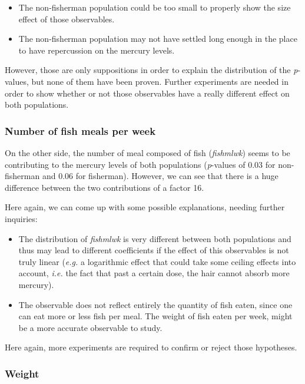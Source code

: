 \documentclass[12pt,]{article}
\providecommand{\tightlist}{%
  \setlength{\itemsep}{0pt}\setlength{\parskip}{0pt}}
\begin{document}
\begin{itemize}
\tightlist
\item
  The non-fisherman population could be too small to properly show the
  size effect of those observables.
\item
  The non-fisherman population may not have settled long enough in the
  place to have repercussion on the mercury levels.
\end{itemize}

However, those are only suppositions in order to explain the
distribution of the \emph{p}-values, but none of them have been proven.
Further experiments are needed in order to show whether or not those
observables have a really different effect on both populations.

\subsubsection{Number of fish meals per
week}\label{number-of-fish-meals-per-week}

On the other side, the number of meal composed of fish (\emph{fishmlwk})
seems to be contributing to the mercury levels of both populations
(\emph{p}-values of 0.03 for non-fisherman and 0.06 for fisherman).
However, we can see that there is a huge difference between the two
contributions of a factor 16.

Here again, we can come up with some possible explanations, needing
further inquiries:

\begin{itemize}
\item
  The distribution of \emph{fishmlwk} is very different between both
  populations and thus may lead to different coefficients if the effect
  of this observables is not truly linear (\emph{e.g.} a logarithmic
  effect that could take some ceiling effects into account, \emph{i.e.}
  the fact that past a certain dose, the hair cannot absorb more
  mercury).
\item
  The observable does not reflect entirely the quantity of fish eaten,
  since one can eat more or less fish per meal. The weight of fish eaten
  per week, might be a more accurate observable to study.
\end{itemize}

Here again, more experiments are required to confirm or reject those
hypotheses.

\subsubsection{Weight}\label{weight}
\end{document}
